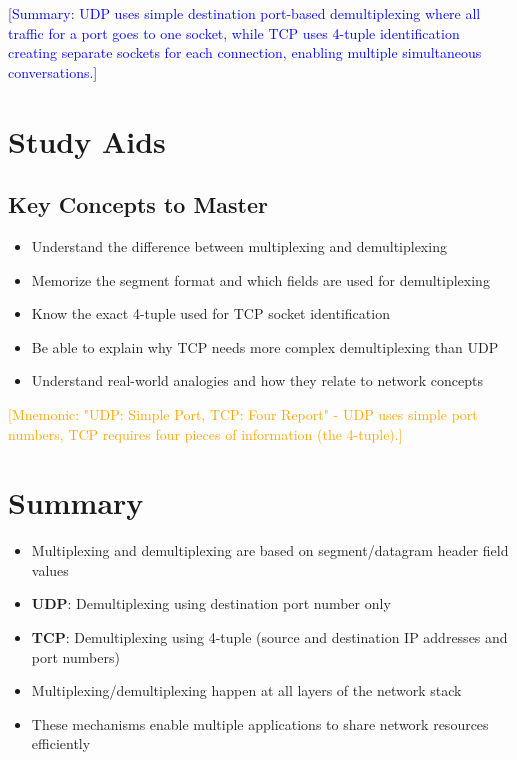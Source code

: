 \documentclass[12pt]{article}
\begin{document}
\textcolor{blue}{[Summary: UDP uses simple destination port-based demultiplexing where all traffic for a port goes to one socket, while TCP uses 4-tuple identification creating separate sockets for each connection, enabling multiple simultaneous conversations.]}

\section{Study Aids}

\subsection{Key Concepts to Master}
\begin{itemize}
    \item Understand the difference between multiplexing and demultiplexing
    \item Memorize the segment format and which fields are used for demultiplexing
    \item Know the exact 4-tuple used for TCP socket identification
    \item Be able to explain why TCP needs more complex demultiplexing than UDP
    \item Understand real-world analogies and how they relate to network concepts
\end{itemize}

\textcolor{orange}{[Mnemonic: "UDP: Simple Port, TCP: Four Report" - UDP uses simple port numbers, TCP requires four pieces of information (the 4-tuple).]}

\section{Summary}

\begin{itemize}
    \item Multiplexing and demultiplexing are based on segment/datagram header field values
    \item \textbf{UDP}: Demultiplexing using destination port number only
    \item \textbf{TCP}: Demultiplexing using 4-tuple (source and destination IP addresses and port numbers)
    \item Multiplexing/demultiplexing happen at all layers of the network stack
    \item These mechanisms enable multiple applications to share network resources efficiently
\end{itemize}
\end{document}
